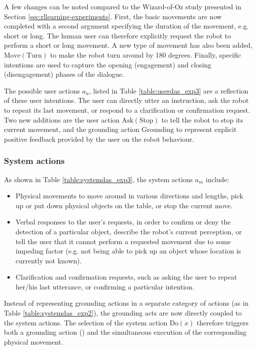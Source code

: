 A few changes can be noted compared to the Wizard-of-Oz study presented in Section \ref{sec:rllearning-experiments}.  First, the basic movements are now completed with a second argument specifying the duration of the movement, e.g. short or long. The human user can therefore explicitly request the robot to perform a short or long movement. A new type of movement has also been added, $\mathrm{Move(Turn)}$ to make the robot turn around by 180 degrees.  Finally, specific intentions are used to capture the opening (engagement) and closing (disengagement) phases of the dialogue. 

The possible user actions $a_u$, listed in Table \ref{table:userdas_exp3} are a reflection of these user intentions. The user can directly utter an instruction, ask the robot to repeat its last movement, or respond to a clarification or confirmation request. Two new additions are the user action $\mathrm{Ask(Stop)}$ to tell the robot to stop its current movement, and the grounding action $\mathrm{Grounding}$ to represent explicit positive feedback provided by the user on the robot behaviour.

\subsubsection*{System actions}
As shown in Table \ref{table:systemdas_exp3}, the system actions $a_m$ include: \begin{itemize}
\item Physical movements to move around in various directions and lengths, pick up or put down physical objects on the table, or stop the current move.
\item Verbal responses to the user's requests, in order to confirm or deny the detection of a particular object, describe the robot's current perception, or tell the user that it cannot perform a requested movement due to some impeding factor (e.g. not being able to pick up an object whose location is currently not known). 
\item Clarification and confirmation requests, such as asking the user to repeat her/his last utterance, or confirming a particular intention.
\end{itemize}

Instead of representing grounding actions in a separate category of actions (as in Table \ref{table:systemdas_exp2}), the grounding acts are now directly coupled to the system actions. The selection of the system action $\mathrm{Do}(x)$ therefore triggers both a grounding action () and the simultaneous execution of the corresponding physical movement. 

